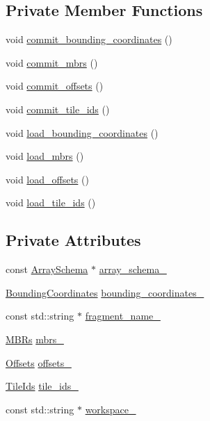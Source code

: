 \subsection*{Private Member Functions}
\begin{DoxyCompactItemize}
\item 
void \hyperlink{classBookKeeping_a5667e2212a7ad6d1e364e5e40741ea0f}{commit\+\_\+bounding\+\_\+coordinates} ()
\item 
void \hyperlink{classBookKeeping_a07591ac286b009bfefcda0bd57e327cc}{commit\+\_\+mbrs} ()
\item 
void \hyperlink{classBookKeeping_acb4d5a73ae51527a46df575f2e7544e4}{commit\+\_\+offsets} ()
\item 
void \hyperlink{classBookKeeping_ad763b288c38e96c8c2836fe264f27d54}{commit\+\_\+tile\+\_\+ids} ()
\item 
void \hyperlink{classBookKeeping_ac7826a7fdaadb30fdb37b009fa2996d7}{load\+\_\+bounding\+\_\+coordinates} ()
\item 
void \hyperlink{classBookKeeping_a318abbefe4a2c9c4aca2aee59bb78db8}{load\+\_\+mbrs} ()
\item 
void \hyperlink{classBookKeeping_a1e47c8969a398860f59d7bc142e4e583}{load\+\_\+offsets} ()
\item 
void \hyperlink{classBookKeeping_a1da6ddec8563cf966916e84469b2eaf0}{load\+\_\+tile\+\_\+ids} ()
\end{DoxyCompactItemize}
\subsection*{Private Attributes}
\begin{DoxyCompactItemize}
\item 
const \hyperlink{classArraySchema}{Array\+Schema} $\ast$ \hyperlink{classBookKeeping_aeea198496f12889838389eaa6d0761ef}{array\+\_\+schema\+\_\+}
\item 
\hyperlink{classBookKeeping_a1eea369202e1cf25c837fbf64a210c4e}{Bounding\+Coordinates} \hyperlink{classBookKeeping_a58112c72f1ee2d6bd902a5a32be67741}{bounding\+\_\+coordinates\+\_\+}
\item 
const std\+::string $\ast$ \hyperlink{classBookKeeping_a169c2f606ef697f977717a687105ced9}{fragment\+\_\+name\+\_\+}
\item 
\hyperlink{classBookKeeping_a3c3be3ebbeab5f23248df738f4d1c897}{M\+B\+Rs} \hyperlink{classBookKeeping_a2e13bd47a7642e8e6e5062f9f7c8d664}{mbrs\+\_\+}
\item 
\hyperlink{classBookKeeping_ac6a1eb7b4c44fee25fda405547b666e1}{Offsets} \hyperlink{classBookKeeping_a7e5a14bb84511e4066f3b387805cb640}{offsets\+\_\+}
\item 
\hyperlink{classBookKeeping_aae405d90bdb11aabd768c4d49ac7f110}{Tile\+Ids} \hyperlink{classBookKeeping_aaccad3c678f7ac3099c9178120ada9d4}{tile\+\_\+ids\+\_\+}
\item 
const std\+::string $\ast$ \hyperlink{classBookKeeping_a87a02b5fe116f6d898da3810e3ab1523}{workspace\+\_\+}
\end{DoxyCompactItemize}
